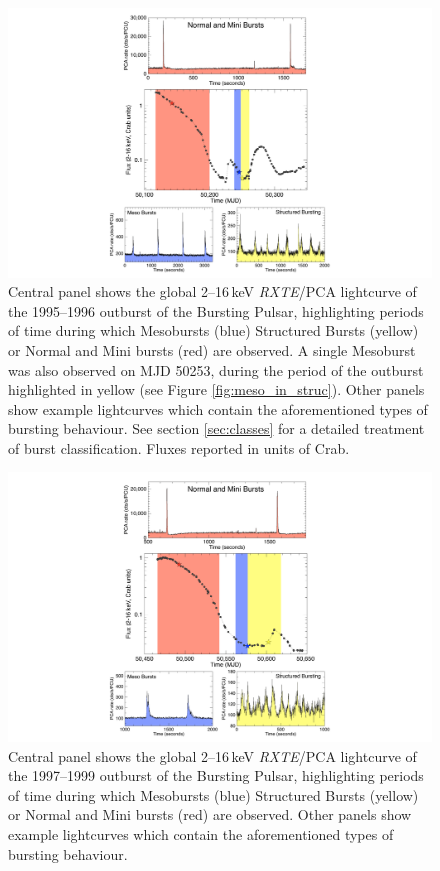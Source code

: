 \begin{figure}
  \centering
  \includegraphics[width=.9\linewidth, trim={9.5cm 0cm 10cm 0cm},clip]{images/obevo1.pdf}
  \caption[Lightcurve of the 1995--1996 outburst of the Bursting Pulsar, highlighting periods of time during which Mesobursts, Structured Bursts or Normal and Mini bursts are observed.]{\small Central panel shows the global 2--16\,keV \textit{RXTE}/PCA lightcurve of the 1995--1996 outburst of the Bursting Pulsar, highlighting periods of time during which Mesobursts (blue) Structured Bursts (yellow) or Normal and Mini bursts (red) are observed.  A single Mesoburst was also observed on MJD 50253, during the period of the outburst highlighted in yellow (see Figure \ref{fig:meso_in_struc}).  Other panels show example lightcurves which contain the aforementioned types of bursting behaviour.  See section \ref{sec:classes} for a detailed treatment of burst classification.  Fluxes reported in units of Crab.}
  \label{fig:ob_evo1}
\end{figure}

\begin{figure}
  \centering
  \includegraphics[width=.9\linewidth, trim={9.5cm 0cm 10cm 0cm},clip]{images/obevo2.pdf}
  \caption[Lightcurve of the 1997--1999 outburst of the Bursting Pulsar, highlighting periods of time during which Mesobursts, Structured Bursts or Normal and Mini bursts are observed.]{\small Central panel shows the global 2--16\,keV \textit{RXTE}/PCA lightcurve of the 1997--1999 outburst of the Bursting Pulsar, highlighting periods of time during which Mesobursts (blue) Structured Bursts (yellow) or Normal and Mini bursts (red) are observed.  Other panels show example lightcurves which contain the aforementioned types of bursting behaviour.}
  \label{fig:ob_evo2}
\end{figure}

